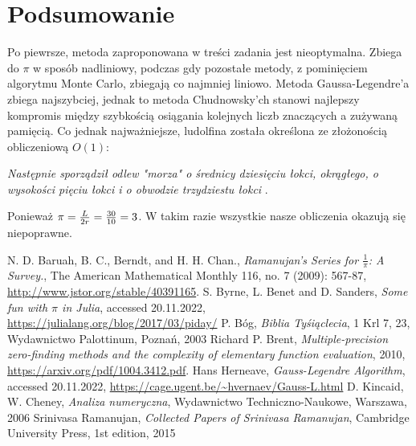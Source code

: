 \documentclass[11pt, wide, leqno]{mwart}
\begin{document}








\newpage

\section{Podsumowanie}

Po piewrsze, metoda zaproponowana w treści zadania jest nieoptymalna. Zbiega do $\pi$ w sposób nadliniowy, podczas gdy pozostałe metody, z pominięciem algorytmu Monte Carlo, zbiegają co najmniej liniowo. Metoda Gaussa-Legendre'a zbiega najszybciej, jednak to metoda Chudnowsky'ch stanowi najlepszy kompromis między szybkością osiągania kolejnych liczb znaczących a zużywaną pamięcią. Co jednak najważniejsze, ludolfina została określona ze złożonością obliczeniową $O(1)$: 

\begin{center}
    \emph{Następnie sporządził odlew "morza" o średnicy dziesięciu łokci, okrągłego, o wysokości pięciu łokci i o obwodzie trzydziestu łokci} \cite{biblia}. 
\end{center}
Ponieważ $\pi={L\over 2r}={30\over 10}=3$. W takim razie wszystkie nasze obliczenia okazują się niepoprawne.

\koniec

\begin{thebibliography}{69}
        N. D. Baruah, B. C., Berndt, and H. H. Chan.,
        \textit{Ramanujan's Series for $\frac1\pi$: A Survey.}, 
        The American Mathematical Monthly 116, no. 7 (2009): 567-87,
        \url{http://www.jstor.org/stable/40391165}.
        S. Byrne, L. Benet and D. Sanders,
        \textit{Some fun with $\pi$ in Julia},
        accessed 20.11.2022,
        \url{https://julialang.org/blog/2017/03/piday/}
        P. Bóg,
        \textit{Biblia Tyśiąclecia}, 1 Krl 7, 23,
        Wydawnictwo Palottinum,
        Poznań, 2003
        Richard P. Brent,
        \textit{Multiple-precision zero-finding methods and the complexity of elementary function evaluation},
        2010,
        \url{https://arxiv.org/pdf/1004.3412.pdf}.
        Hans Herneave,
        \textit{Gauss-Legendre Algorithm},
        accessed 20.11.2022,
        \url{https://cage.ugent.be/~hvernaev/Gauss-L.html}
        D. Kincaid, W. Cheney,
        \textit{Analiza numeryczna},
        Wydawnictwo Techniczno-Naukowe,
        Warszawa, 2006
        Srinivasa Ramanujan,
        \textit{Collected Papers of Srinivasa Ramanujan}, 
        Cambridge University Press,
        1st edition,
        2015
\end{thebibliography}
\end{document}
